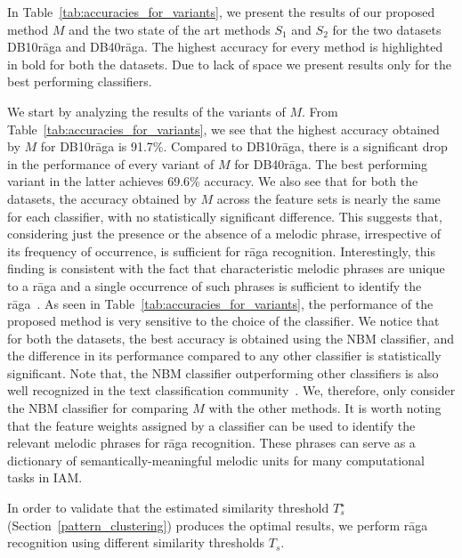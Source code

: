 In Table~\ref{tab:accuracies_for_variants}, we present the results of our proposed method $M$ and the two state of the art methods $S_1$ and $S_2$ for the two datasets DB10r\={a}ga and DB40r\={a}ga. The highest accuracy for every method is highlighted in bold for both the datasets. Due to lack of space we present results only for the best performing classifiers. 

We start by analyzing the results of the variants of $M$. From Table~\ref{tab:accuracies_for_variants}, we see that the highest accuracy obtained by $M$ for DB10r\={a}ga is 91.7\%. Compared to DB10r\={a}ga, there is a significant drop in the performance of every variant of $M$ for DB40r\={a}ga. The best performing variant in the latter achieves 69.6\% accuracy. We also see that for both the datasets, the accuracy obtained by $M$ across the feature sets is nearly the same for each classifier, with no statistically significant difference. This suggests that, considering just the presence or the absence of a melodic phrase, irrespective of its frequency of occurrence, is sufficient for r\={a}ga recognition. Interestingly, this finding is consistent with the fact that characteristic melodic phrases are unique to a r\={a}ga and a single occurrence of such phrases is sufficient to identify the r\={a}ga~\cite{krishna2012carnatic}. As seen in Table~\ref{tab:accuracies_for_variants}, the performance of the proposed method is very sensitive to the choice of the classifier. We notice that for both the datasets, the best accuracy is obtained using the NBM classifier, and the difference in its performance compared to any other classifier is statistically significant. Note that, the NBM classifier outperforming other classifiers is also well recognized in the text classification community~\cite{mccallum1998comparison}. We, therefore, only consider the NBM classifier for comparing $M$ with the other methods. It is worth noting that the feature weights assigned by a classifier can be used to identify the relevant melodic phrases for r\={a}ga recognition. These phrases can serve as a dictionary of semantically-meaningful melodic units for many computational tasks in IAM.

In order to validate that the estimated similarity threshold $T_{s}^\star$ (Section~\ref{pattern_clustering}) produces the optimal results, we perform r\={a}ga recognition using different similarity thresholds $T_{s}$. 

